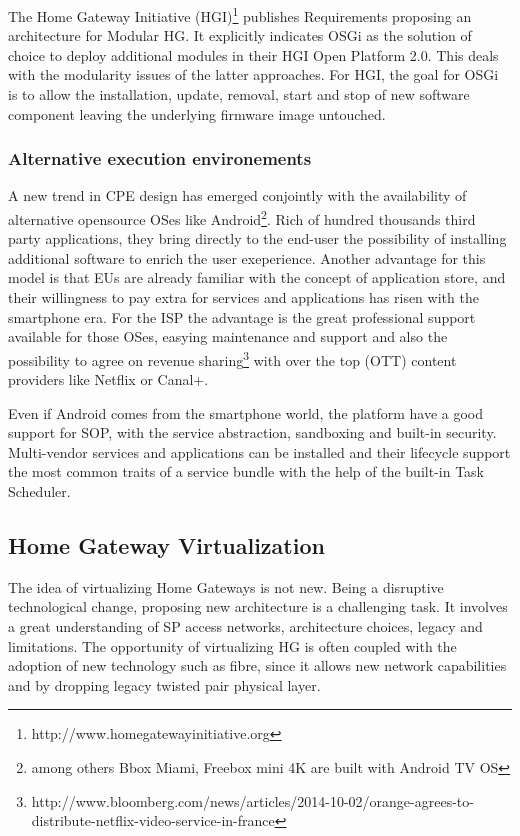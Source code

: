 The Home Gateway Initiative (HGI)\footnote{http://www.homegatewayinitiative.org} publishes Requirements \cite{_requirements_2011} \cite{_hg_2014} proposing an architecture for Modular HG.
It explicitly indicates OSGi as the solution of choice to deploy additional modules in their HGI Open Platform 2.0.
This deals with the modularity issues of the latter approaches.
For HGI, the goal for OSGi is to allow the installation, update, removal, start and stop of new software component leaving the underlying firmware image untouched.

\subsubsection{Alternative execution environements}

A new trend in CPE design has emerged conjointly with the availability of alternative opensource OSes like Android\footnote{among others Bbox Miami, Freebox mini 4K are built with Android TV OS}.
Rich of hundred thousands third party applications, they bring directly to the end-user the possibility of installing additional software to enrich the user exeperience.
Another advantage for this model is that EUs are already familiar with the concept of application store, and their willingness to pay extra for services and applications has risen with the smartphone era.
For the ISP the advantage is the great professional support available for those OSes, easying maintenance and support and also the possibility to agree on revenue sharing\footnote{http://www.bloomberg.com/news/articles/2014-10-02/orange-agrees-to-distribute-netflix-video-service-in-france} with over the top (OTT) content providers like Netflix or Canal+.

Even if Android comes from the smartphone world, the platform have a good support for SOP, with the service abstraction, sandboxing and built-in security. Multi-vendor services and applications can be installed and their lifecycle support the most common traits of a service bundle with the help of the built-in Task Scheduler.


\subsection{Home Gateway Virtualization}
The idea of virtualizing Home Gateways is not new.
Being a disruptive technological change, proposing new architecture is a challenging task.
It involves a great understanding of SP access networks, architecture choices, legacy and limitations.
The opportunity of virtualizing HG is often coupled with the adoption of new technology such as fibre, since it allows new network capabilities and by dropping legacy twisted pair physical layer.

